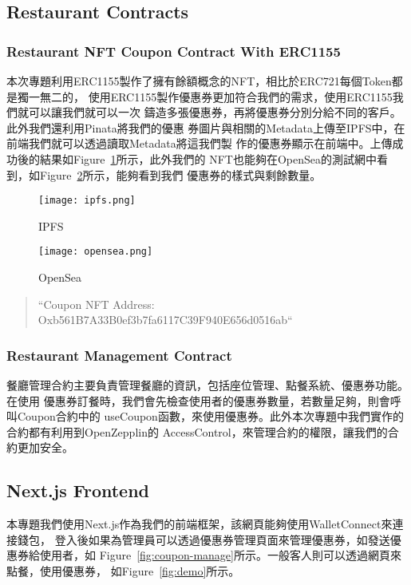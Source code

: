 \subsection{Restaurant Contracts}

\subsubsection{Restaurant NFT Coupon Contract With ERC1155}

本次專題利用ERC1155製作了擁有餘額概念的NFT，相比於ERC721每個Token都是獨一無二的，
使用ERC1155製作優惠券更加符合我們的需求，使用ERC1155我們就可以讓我們就可以一次
鑄造多張優惠券，再將優惠券分別分給不同的客戶。此外我們還利用Pinata將我們的優惠
券圖片與相關的Metadata上傳至IPFS中，在前端我們就可以透過讀取Metadata將這我們製
作的優惠券顯示在前端中。上傳成功後的結果如Figure~\ref{fig:ipfs}所示，此外我們的
NFT也能夠在OpenSea的測試網中看到，如Figure~\ref{fig:opensea}所示，能夠看到我們
優惠券的樣式與剩餘數量。


\begin{figure}[H]
  \centering
  \texttt{[image: ipfs.png]}
  \caption{IPFS}
  \label{fig:ipfs}
\end{figure}

\begin{figure}[H]
  \centering
  \texttt{[image: opensea.png]}
  \caption{OpenSea}
  \label{fig:opensea}
\end{figure}

\begin{quote}
``Coupon NFT Address: Oxb561B7A33B0ef3b7fa6117C39F940E656d0516ab``
\end{quote}


\subsubsection{Restaurant Management Contract}

餐廳管理合約主要負責管理餐廳的資訊，包括座位管理、點餐系統、優惠券功能。在使用
優惠券訂餐時，我們會先檢查使用者的優惠券數量，若數量足夠，則會呼叫Coupon合約中的
useCoupon函數，來使用優惠券。此外本次專題中我們實作的合約都有利用到OpenZepplin的
AccessControl，來管理合約的權限，讓我們的合約更加安全。

\subsection{Next.js Frontend}

本專題我們使用Next.js作為我們的前端框架，該網頁能夠使用WalletConnect來連接錢包，
登入後如果為管理員可以透過優惠券管理頁面來管理優惠券，如發送優惠券給使用者，如
Figure~\ref{fig:coupon-manage}所示。一般客人則可以透過網頁來點餐，使用優惠券，
如Figure~\ref{fig:demo}所示。

